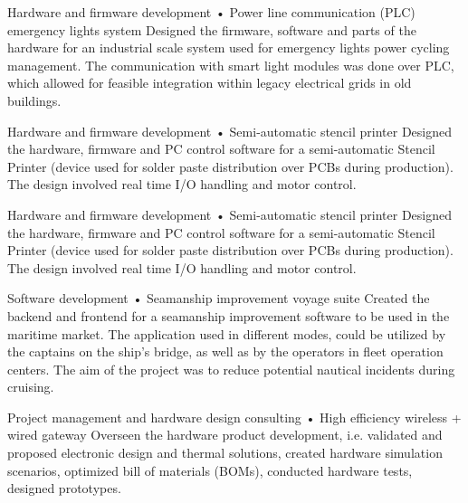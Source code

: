 \documentclass{tccv}
\begin{document}
\begin{yearlist}
\item[Hardware and firmware development]{•}
     {Power line communication (PLC) emergency lights system}
     {Designed the firmware, software and parts of the hardware for an industrial scale system used for emergency lights power cycling management. The communication with smart light modules was done over PLC, which allowed for feasible integration within legacy electrical grids in old buildings.}   
     
\item[Hardware and firmware development]{•}
     {Semi-automatic stencil printer}
     {Designed the hardware, firmware and PC control software for a semi-automatic Stencil Printer (device used for solder paste distribution over PCBs during production). The design involved real time I/O handling and motor control.}
     
\item[Hardware and firmware development]{•}
     {Semi-automatic stencil printer}
     {Designed the hardware, firmware and PC control software for a semi-automatic Stencil Printer (device used for solder paste distribution over PCBs during production). The design involved real time I/O handling and motor control.}    
     
\item[Software development]{•}
     {Seamanship improvement voyage suite}
     {Created the backend and frontend for a seamanship improvement software to be used in the maritime market. The application used in different modes, could be utilized by the captains on the ship's bridge, as well as by the operators in fleet operation centers. The aim of the project was to reduce potential nautical incidents during cruising.}        
     
\item[Project management and hardware design consulting]{•}
     {High efficiency wireless + wired gateway}
     {Overseen the hardware product development, i.e. validated and proposed electronic design and thermal solutions, created hardware simulation scenarios, optimized bill of materials (BOMs), conducted hardware tests, designed prototypes.}             

\end{yearlist}
\end{document}
